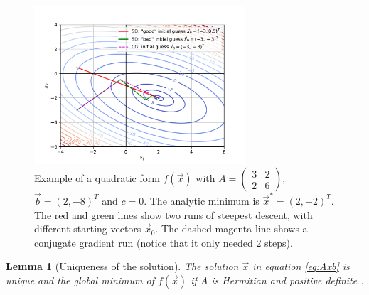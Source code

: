 \documentclass{article}
\theoremstyle{plain} %
\newtheorem{lemma}[theorem]{Lemma}
\theoremstyle{convention} %
\theoremstyle{remark} %
\numberwithin{equation}{section}
\begin{document}
\begin{figure}
    \centering
    \includegraphics[width=0.7\textwidth]{plots/qform_contour2}
    \caption{Example of a quadratic form $f(\vec{x})$ with $A = \begin{pmatrix}
        3 & 2 \\
        2 & 6
    \end{pmatrix}$, $\vec{b} = (2, -8)^T$ and $c=0$. The analytic minimum is $\vec{x}^{*} = (2, -2)^T$. The red and green lines show two runs of steepest descent, with different starting vectors $\vec{x}_0$. The dashed magenta line shows a conjugate gradient run (notice that it only needed \num{2} steps).}
    \label{fig:qform}
\end{figure}

\begin{lemma}[Uniqueness of the solution]
The solution $\vec{x}$ in equation \eqref{eq:Axb} is unique and the global minimum of $f(\vec{x})$ if $A$ is Hermitian and positive definite \footnotemark.
\end{lemma}

\end{document}
